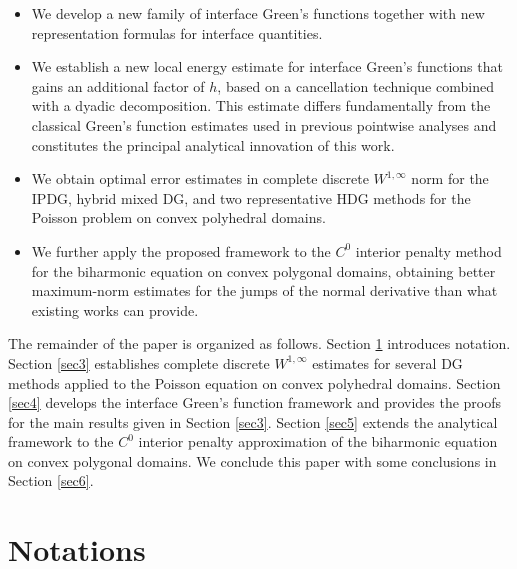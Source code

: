 \documentclass[1996/10/24]{amsart}
\theoremstyle{definition}
\numberwithin{equation}{section}
\begin{document}
\begin{itemize}
\item We develop a new family of interface Green's functions together with new representation formulas for interface quantities.

\item We establish a new local energy estimate for interface Green's functions that gains an additional factor of $h$, based on a cancellation technique combined with a dyadic decomposition. This estimate differs fundamentally from the classical Green's function estimates used in previous pointwise analyses and constitutes the principal analytical innovation of this work.

\item We obtain optimal error estimates in complete discrete $W^{1,\infty}$ norm for the IPDG, hybrid mixed DG, and two representative HDG methods for the Poisson problem on convex polyhedral domains.

\item We further apply the proposed framework to the $C^0$ interior penalty method for the biharmonic equation on convex polygonal domains, obtaining better maximum-norm estimates for the jumps of the normal derivative than
what existing works \cite{l2021,hltwz2026} can provide.
\end{itemize}

The remainder of the paper is organized as follows. Section \ref{sec2} introduces notation. Section \ref{sec3} establishes complete discrete $W^{1,\infty}$ estimates for several DG methods applied to the Poisson equation on convex polyhedral domains. Section \ref{sec4} develops the interface Green's function framework and provides the proofs for the main results given in Section \ref{sec3}. Section \ref{sec5} extends the analytical framework to the $C^0$ interior penalty approximation of the biharmonic equation on convex polygonal domains. We conclude this paper with some conclusions in Section \ref{sec6}.

\section{Notations}\label{sec2}
\end{document}
